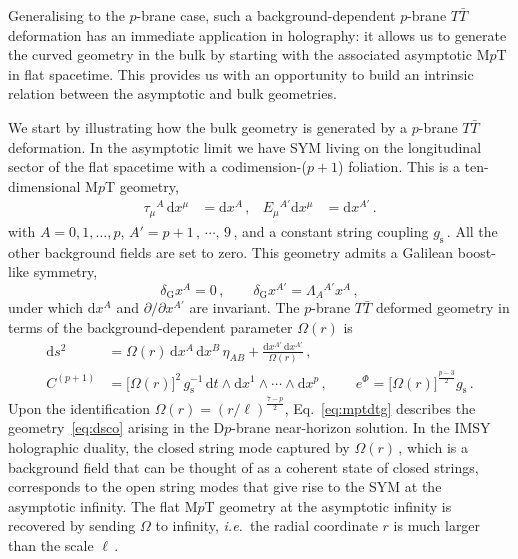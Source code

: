 \documentclass[11pt]{article}
\newcommand{\be}{\begin{equation}}
\newcommand{\ee}{\end{equation}}
\newcommand{\p}{\partial}
\renewcommand{\emph}[1]{\textit{#1}}
\newcommand{\dd}{\mathrm{d}}
\begin{document}
Generalising to the $p$-brane case, such a background-dependent $p$-brane $T\bar{T}$ deformation has an immediate application in holography: it allows us to generate the curved geometry in the bulk by starting with the associated asymptotic M$p$T in flat spacetime. This provides us with an opportunity to build an intrinsic relation between the asymptotic and bulk geometries. 

We start by illustrating how the bulk geometry is generated by a $p$-brane $T\bar{T}$ deformation. In the asymptotic limit we have SYM living on the longitudinal sector of the flat spacetime with a codimension-($p+1$) foliation. This is a ten-dimensional M$p$T geometry,
%
\begin{align} \label{eq:asyMpTgeo}
	\tau^{}_\mu{}^A \, \dd x^\mu & = \dd x^A \,,
        &%
    E^{}_\mu{}^{A'} \dd x^\mu & = \dd x^{A'}\,.
\end{align}
%
with $A=0,1,\dots,p$, $A' = p + 1\,, \, \cdots, \, 9$\,, and a constant string coupling $g^{}_\text{s}$\,. All the other background fields are set to zero. This geometry admits a Galilean boost-like symmetry,
%
\be
    \delta^{}_\text{G} x^{A} = 0\,,
        \qquad%
    \delta^{}_\text{G} x^{A'} = \Lambda^{}_A{}^{A'} x^A\,,
\ee
%
under which $\dd x^A$ and $\p / \p x^{A'}$ are invariant. The $p$-brane $T\bar{T}$ deformed geometry in terms of the background-dependent parameter $\mathbb{\Omega}(r)$ is
%
\begin{subequations} \label{eq:mptdtg}
\begin{align} 
	\dd s^2 & = \mathbb{\Omega} (r) \, \dd x^A \, \dd x^{B} \, \eta^{}_{AB} + \frac{\dd x^{A'} \, \dd x^{A'}}{\mathbb{\Omega} (r)}\,, \\[4pt] 
    C^{(p+1)} & = \bigl[ \mathbb{\Omega}(r) \bigr]^2 \, g^{-1}_\text{s} \, \dd t \wedge \dd x^1 \! \wedge \cdots \wedge \dd x^{p}\,, 
        \qquad%
    e^\Phi = \bigl[ \mathbb{\Omega}(r) \bigr]^{\!\frac{p-3}{2}} g^{}_\text{s}\,.
\end{align}
\end{subequations}
%
Upon the identification $\mathbb{\Omega} (r) = (r / \ell)^{\frac{7-p}{2}}$, Eq.~\eqref{eq:mptdtg} describes the geometry~\eqref{eq:dsco} arising in the D$p$-brane near-horizon solution. In the IMSY holographic duality, the closed string mode captured by $\mathbb{\Omega}(r)$\,, which is a background field that can be thought of as a coherent state of closed strings, corresponds to the open string modes that give rise to the SYM at the asymptotic infinity. The flat M$p$T geometry at the asymptotic infinity is recovered by sending $\mathbb{\Omega}$ to infinity, \emph{i.e.}~the radial coordinate $r$ is much larger than the scale $\ell$\,. 
\end{document}
